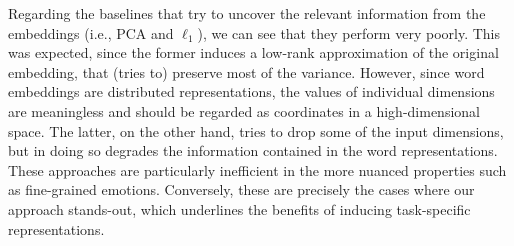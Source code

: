 \documentclass[letterpaper]{article}
\begin{document}
\begin{table}[!htb]
  \centering  
  \small
    \caption{Results for categorical lexicons in terms of Avg. $F_1$ \label{tab:cat}}
\end{table} 

Regarding the baselines that try to uncover the relevant information from the embeddings (i.e., PCA and $\ell_1$), we can see that they perform very poorly. This was expected, since the former induces a low-rank approximation of the original embedding, that (tries to) preserve most of the variance. However, since word embeddings are distributed representations, the values of individual dimensions are meaningless and should be regarded as coordinates in a high-dimensional space. The latter, on the other hand, tries to drop some of the input dimensions, but in doing so degrades the information contained in the word representations. These approaches are particularly inefficient in the more nuanced properties such as fine-grained emotions. Conversely, these are precisely the cases where our approach stands-out, which underlines the benefits of inducing task-specific representations. 
\end{document}
